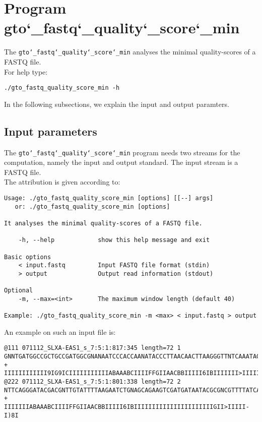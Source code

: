 \section{Program gto\char`_fastq\char`_quality\char`_score\char`_min}
The \texttt{gto\char`_fastq\char`_quality\char`_score\char`_min} analyses the minimal quality-scores of a FASTQ file.\\
For help type:
\begin{lstlisting}
./gto_fastq_quality_score_min -h
\end{lstlisting}
In the following subsections, we explain the input and output paramters.

\subsection*{Input parameters}

The \texttt{gto\char`_fastq\char`_quality\char`_score\char`_min} program needs two streams for the computation, namely the input and output standard. The input stream is a FASTQ file.\\
The attribution is given according to:
\begin{lstlisting}
Usage: ./gto_fastq_quality_score_min [options] [[--] args]
   or: ./gto_fastq_quality_score_min [options]

It analyses the minimal quality-scores of a FASTQ file.

    -h, --help            show this help message and exit

Basic options
    < input.fastq         Input FASTQ file format (stdin)
    > output              Output read information (stdout)

Optional
    -m, --max=<int>       The maximum window length (default 40)

Example: ./gto_fastq_quality_score_min -m <max> < input.fastq > output
\end{lstlisting}
An example on such an input file is:
\begin{lstlisting}
@111 071112_SLXA-EAS1_s_7:5:1:817:345 length=72 1
GNNTGATGGCCGCTGCCGATGGCGNANAATCCCACCAANATACCCTTAACAACTTAAGGGTTNTCAAATAGA
+
IIIIIIIIIIII9IG9ICIIIIIIIIIIIABAAABCIIIIFFGIIAACBBIIIII6IBIIIIIII>IIIIII/
@222 071112_SLXA-EAS1_s_7:5:1:801:338 length=72 2
NTTCAGGGATACGACGNTTGTATTTTAAGAATCTGNAGCAGAAGTCGATGATAATACGCGNCGTTTTATCAN
+
IIIIIIIABAAABCIIIIFFGIIAACBBIIIII6IBIIIIIIIIIIIIIIIIIIIIIIGII>IIIII-I)8I
\end{lstlisting}

